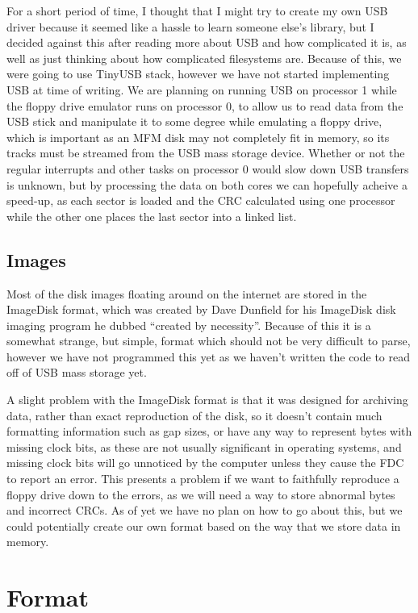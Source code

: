 \documentclass[a4paper]{article}
\begin{document}
For a short period of time, I thought that I might try to create my
own USB driver because it seemed like a hassle to learn someone else's
library, but I decided against this after reading more about USB and
how complicated it is, as well as just thinking about how complicated
filesystems are. Because of this, we were going to use TinyUSB stack,
however we have not started implementing USB at time of writing. We
are planning on running USB on processor 1 while the floppy drive
emulator runs on processor 0, to allow us to read data from the USB
stick and manipulate it to some degree while emulating a floppy drive,
which is important as an MFM disk may not completely fit in memory, so
its tracks must be streamed from the USB mass storage device. Whether
or not the regular interrupts and other tasks on processor 0 would
slow down USB transfers is unknown, but by processing the data on both
cores we can hopefully acheive a speed-up, as each sector is loaded
and the CRC calculated using one processor while the other one places
the last sector into a linked list.

\subsection{Images}

Most of the disk images floating around on the internet are stored in
the ImageDisk format, which was created by Dave Dunfield for his
ImageDisk disk imaging program he dubbed ``created by
necessity''. Because of this it is a somewhat strange, but simple,
format which should not be very difficult to parse, however we have
not programmed this yet as we haven't written the code to read off of
USB mass storage yet.

A slight problem with the ImageDisk format is that it was designed for
archiving data, rather than exact reproduction of the disk, so it
doesn't contain much formatting information such as gap sizes, or have
any way to represent bytes with missing clock bits, as these are not
usually significant in operating systems, and missing clock bits will
go unnoticed by the computer unless they cause the FDC to report an
error. This presents a problem if we want to faithfully reproduce a
floppy drive down to the errors, as we will need a way to store
abnormal bytes and incorrect CRCs. As of yet we have no plan on how to
go about this, but we could potentially create our own format based on
the way that we store data in memory.

\section{Format}
\end{document}
